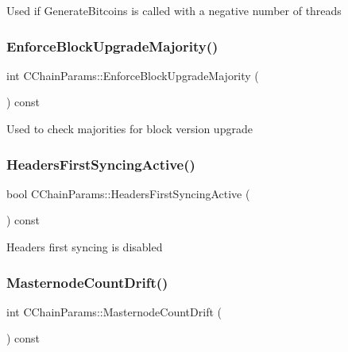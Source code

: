 Used if Generate\+Bitcoins is called with a negative number of threads \mbox{\label{class_c_chain_params_ac55b927a13650f1b6593b0200258ce62}} 
\subsubsection{\texorpdfstring{Enforce\+Block\+Upgrade\+Majority()}{EnforceBlockUpgradeMajority()}}
{\footnotesize\ttfamily int C\+Chain\+Params\+::\+Enforce\+Block\+Upgrade\+Majority (\begin{DoxyParamCaption}{ }\end{DoxyParamCaption}) const\hspace{0.3cm}{\ttfamily [inline]}}

Used to check majorities for block version upgrade \mbox{\label{class_c_chain_params_ae1bf9eed6ce76328909127bfc9965f76}} 
\subsubsection{\texorpdfstring{Headers\+First\+Syncing\+Active()}{HeadersFirstSyncingActive()}}
{\footnotesize\ttfamily bool C\+Chain\+Params\+::\+Headers\+First\+Syncing\+Active (\begin{DoxyParamCaption}{ }\end{DoxyParamCaption}) const\hspace{0.3cm}{\ttfamily [inline]}}

Headers first syncing is disabled \mbox{\label{class_c_chain_params_a9d2e5ae617867ebcb930c65a146b6e5c}} 
\subsubsection{\texorpdfstring{Masternode\+Count\+Drift()}{MasternodeCountDrift()}}
{\footnotesize\ttfamily int C\+Chain\+Params\+::\+Masternode\+Count\+Drift (\begin{DoxyParamCaption}{ }\end{DoxyParamCaption}) const\hspace{0.3cm}{\ttfamily [inline]}}

